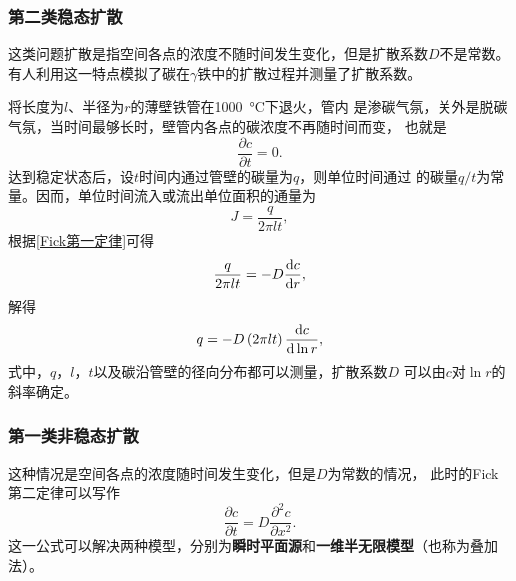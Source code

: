             \subsubsection{第二类稳态扩散}
                这类问题扩散是指空间各点的浓度不随时间发生变化，但是扩散系数$D$不是常数。
                有人利用这一特点模拟了碳在$\gamma$铁中的扩散过程并测量了扩散系数。

                将长度为$l$、半径为$r$的薄壁铁管在\SI{1000}{\celsius}下退火，管内
                是渗碳气氛，关外是脱碳气氛，当时间最够长时，壁管内各点的碳浓度不再随时间而变，
                也就是
                \begin{equation}
                    \frac{\partial c}{\partial t}=0.
                \end{equation}
                达到稳定状态后，设$t$时间内通过管壁的碳量为$q$，则单位时间通过
                的碳量$q/t$为常量。因而，单位时间流入或流出单位面积的通量为
                \begin{equation}
                    J=\frac{q}{2\pi lt},
                \end{equation}
                根据\autoref{Fick第一定律}可得
                \begin{equation}
                    \frac{q}{2\pi lt}=-D\frac{\mathop{}\!\mathrm{d} c}{\mathop{}\!\mathrm{d} r},
                \end{equation}
                解得
                \begin{equation}
                    q=-D\left( 2\pi lt \right)\frac{\mathop{}\!\mathrm{d} c}{\mathop{}\!\mathrm{d} \ln r},
                \end{equation}
                式中，$q$，$l$，$t$以及碳沿管壁的径向分布都可以测量，扩散系数$D$
                可以由$c$对$\ln r$的斜率确定。

            \subsubsection{第一类非稳态扩散}
                这种情况是空间各点的浓度随时间发生变化，但是$D$为常数的情况，
                此时的Fick第二定律可以写作
                \begin{equation}
                    \frac{\partial c}{\partial t}=D \frac{\partial^{2} c}{\partial x^{2}}.
                \end{equation}
                这一公式可以解决两种模型，分别为\textbf{瞬时平面源}和\textbf{一维半无限模型}（也称为叠加法）。

